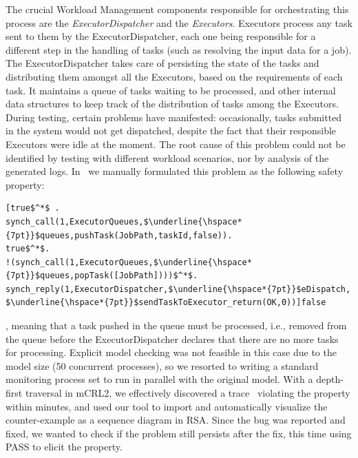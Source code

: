 \documentclass[letter]{llncs}
\begin{document}
The crucial Workload Management components responsible for orchestrating this process are the \emph{ExecutorDispatcher} and 
the \emph{Executors}. Executors process any task sent to them by the ExecutorDispatcher, each one being responsible for a different step in the handling of tasks
(such as resolving the input data for a job).
The ExecutorDispatcher takes care of persisting the state of the tasks and distributing them amongst all the Executors, based on the
requirements of each task. It maintains a queue of tasks waiting to be processed, and other internal data structures to keep track
of the distribution of tasks among the Executors.
During testing, certain problems have manifested: occasionally, tasks submitted in the system would not get dispatched, despite the fact that their responsible Executors
were idle at the moment. The root cause of this problem could not be identified by testing  with different workload scenarios, nor by analysis of the 
generated logs. 
In~\cite{DBLP:dblp_conf/nfm/RemenskaTWHVCB13} we manually formulated this problem as the following safety property:
\begin{lstlisting}[basicstyle=\sffamily\fontsize{7}{7}\selectfont,showspaces=false,showstringspaces=false,showtabs=false,mathescape]
[true$^*$ .
synch_call(1,ExecutorQueues,$\underline{\hspace*{7pt}}$queues,pushTask(JobPath,taskId,false)).
true$^*$.
!(synch_call(1,ExecutorQueues,$\underline{\hspace*{7pt}}$queues,popTask([JobPath])))$^*$.
synch_reply(1,ExecutorDispatcher,$\underline{\hspace*{7pt}}$eDispatch,
$\underline{\hspace*{7pt}}$sendTaskToExecutor_return(OK,0))]false 
\end{lstlisting} 
, meaning that a task pushed in the queue must be processed, i.e., removed from the queue before the ExecutorDispatcher
declares that there are no more tasks for processing.
Explicit model checking was not feasible in this case due to the model size (50 concurrent processes),
so we resorted to writing a standard monitoring process set to run in parallel with the original model.
With a depth-first traversal in mCRL2, we effectively discovered a trace~\cite{repo:remenska} violating the property within minutes, and
used our tool to import and automatically visualize the counter-example as a sequence diagram in RSA.
Since the bug was reported and fixed, we wanted to check if the problem still persists after the fix, this time using PASS to 
elicit the property.
\end{document}
